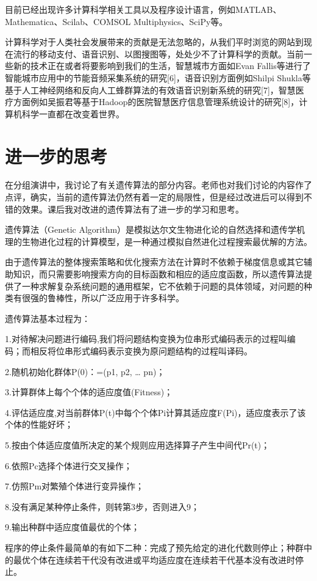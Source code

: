 \documentclass{article}
\begin{document}
目前已经出现许多计算科学相关工具以及程序设计语言，例如MATLAB、Mathematica、Scilab、COMSOL Multiphysics、SciPy等。

计算科学对于人类社会发展带来的贡献是无法忽略的，从我们平时浏览的网站到现在流行的移动支付、语音识别、以图搜图等，处处少不了计算科学的贡献。当前一些新的技术正在或者将要影响到我们的生活，智慧城市方面如Evan Fallis等进行了智能城市应用中的节能音频采集系统的研究[6]，语音识别方面例如Shilpi Shukla等基于人工神经网络和反向人工蜂群算法的有效语音识别新系统的研究[7]，智慧医疗方面例如吴振君等基于Hadoop的医院智慧医疗信息管理系统设计的研究[8]，计算机科学一直都在改变着世界。


\section{进一步的思考}
在分组演讲中，我讨论了有关遗传算法的部分内容。老师也对我们讨论的内容作了点评，确实，当前的遗传算法仍然有着一定的局限性，但是经过改进后可以得到不错的效果。课后我对改进的遗传算法有了进一步的学习和思考。

遗传算法（Genetic Algorithm）是模拟达尔文生物进化论的自然选择和遗传学机理的生物进化过程的计算模型，是一种通过模拟自然进化过程搜索最优解的方法。

由于遗传算法的整体搜索策略和优化搜索方法在计算时不依赖于梯度信息或其它辅助知识，而只需要影响搜索方向的目标函数和相应的适应度函数，所以遗传算法提供了一种求解复杂系统问题的通用框架，它不依赖于问题的具体领域，对问题的种类有很强的鲁棒性，所以广泛应用于许多科学。

遗传算法基本过程为：

1.对待解决问题进行编码,我们将问题结构变换为位串形式编码表示的过程叫编码；而相反将位串形式编码表示变换为原问题结构的过程叫译码。

2.随机初始化群体P(0)：=(p1, p2, … pn)；

3.计算群体上每个个体的适应度值(Fitness)；

4.评估适应度,对当前群体P(t)中每个个体Pi计算其适应度F(Pi)，适应度表示了该个体的性能好坏；

5.按由个体适应度值所决定的某个规则应用选择算子产生中间代Pr(t)；

6.依照Pc选择个体进行交叉操作；

7.仿照Pm对繁殖个体进行变异操作；

8.没有满足某种停止条件，则转第3步，否则进入9；

9.输出种群中适应度值最优的个体；

程序的停止条件最简单的有如下二种：完成了预先给定的进化代数则停止；种群中的最优个体在连续若干代没有改进或平均适应度在连续若干代基本没有改进时停止。
\end{document}
